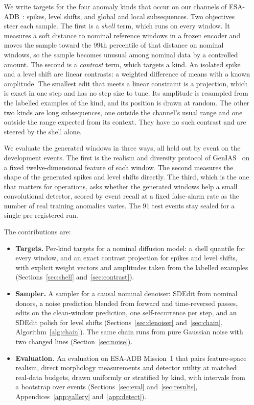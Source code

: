 \documentclass[11pt,a4paper]{article}
\begin{document}
We write targets for the four anomaly kinds that occur on our channels of
ESA-ADB~\cite{kotowski2024esa,blazquez2021taxonomy}: spikes, level shifts,
and global and local subsequences. Two objectives steer each sample. The
first is a \emph{shell} term, which runs on every window. It measures a soft
distance to nominal reference windows in a frozen encoder and moves the sample
toward the 99th percentile of that distance on nominal windows, so the sample
becomes unusual among nominal data by a controlled amount. The second is a
\emph{contrast} term, which targets a kind. An isolated spike and a level
shift are linear contrasts: a weighted difference of means with a known
amplitude. The smallest edit that meets a linear constraint is a projection,
which is exact in one step and has no step size to tune. Its amplitude is
resampled from the labelled examples of the kind, and its position is drawn at
random. The other two kinds are long subsequences, one outside the channel's
usual range and one outside the range expected from its context. They have no
such contrast and are steered by the shell alone.

We evaluate the generated windows in three ways, all held out by event on the
development events. The first is the realism and diversity protocol of
GenIAS~\cite{genias2025} on a fixed twelve-dimensional feature of each window.
The second measures the shape of the generated spikes and level shifts
directly. The third, which is the one that matters for operations, asks
whether the generated windows help a small convolutional detector, scored by
event recall at a fixed false-alarm rate as the number of real training
anomalies varies. The 91 test events stay sealed for a single pre-registered
run.

The contributions are:
\begin{itemize}
\setlength{\itemsep}{1pt}
\item \textbf{Targets.} Per-kind targets for a nominal diffusion model: a
  shell quantile for every window, and an exact contrast projection for spikes
  and level shifts, with explicit weight vectors and amplitudes taken from the
  labelled examples (Sections~\ref{sec:shell} and~\ref{sec:contrast}).
\item \textbf{Sampler.} A sampler for a causal nominal denoiser: SDEdit from
  nominal donors, a noise prediction blended from forward and time-reversed
  passes, edits on the clean-window prediction, one self-recurrence per step,
  and an SDEdit polish for level shifts (Sections~\ref{sec:denoiser}
  and~\ref{sec:chain}, Algorithm~\ref{alg:chain}). The same chain runs from
  pure Gaussian noise with two changed lines (Section~\ref{sec:noise}).
\item \textbf{Evaluation.} An evaluation on ESA-ADB Mission~1 that pairs
  feature-space realism, direct morphology measurements and detector utility
  at matched real-data budgets, drawn uniformly or stratified by kind, with
  intervals from a bootstrap over events (Sections~\ref{sec:eval}
  and~\ref{sec:results}, Appendices~\ref{app:gallery}
  and~\ref{app:detect}).
\end{itemize}
\end{document}
